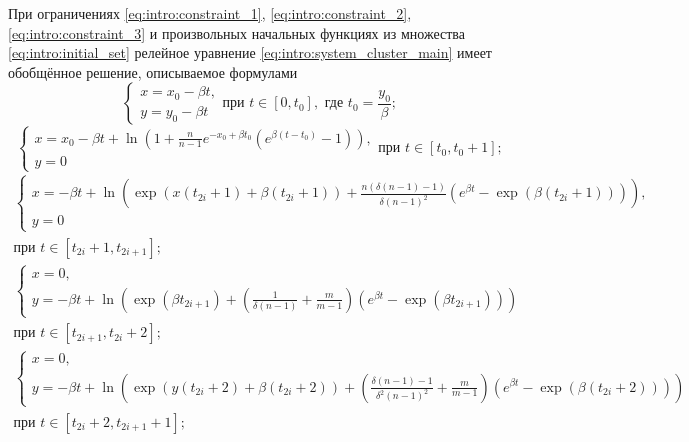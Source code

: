 	При ограничениях \eqref{eq:intro:constraint_1}, \eqref{eq:intro:constraint_2}, \eqref{eq:intro:constraint_3}  и произвольных начальных функциях из множества \eqref{eq:intro:initial_set} релейное уравнение \eqref{eq:intro:system_cluster_main} имеет обобщённое решение, описываемое формулами
	\small
	\begin{equation}
		\label{eq:intro:step1_solution}
		\begin{cases}
			x = x_0 - \beta t,\\
			y = y_0 - \beta t
		\end{cases}
		\text{при } t \in [0, t_0], \text{ где } t_0 = \dfrac{y_0}{\beta};
	\end{equation}
	\begin{equation}
		\label{eq:intro:step2_solution}
		\begin{cases}
			x = x_0 - \beta t + \ln\left(1 + \frac{n}{n - 1} e^{-x_0 + \beta t_0}  (e^{\beta  (t - t_0)} - 1)\right),\\
			y = 0
		\end{cases}
		\text{при } t \in [t_0, t_0 + 1];
	\end{equation}
	\begin{multline}
		\label{eq:intro:step3_solution}
		\begin{cases}
			x = -\beta t + \ln\left(\exp(x(t_{2i} + 1) + \beta (t_{2i} + 1)) + \frac{n (\delta(n - 1) - 1)}{\delta (n - 1)^2} (e^{\beta t} - \exp(\beta (t_{2i} + 1)))\right)
			,\\
			y = 0
		\end{cases}\\
		\text{при } t \in [t_{2i} + 1, t_{2i + 1}];
	\end{multline}
	\begin{multline}
		\label{eq:intro:step4_solution}
		\begin{cases}
			x = 0,\\
			y = -\beta t + \ln\left(\exp(\beta t_{2i + 1}) + \left(\frac{1}{\delta(n - 1)} + \frac{m}{m - 1}\right) (e^{\beta t} - \exp(\beta t_{2i + 1}))\right)
		\end{cases}\\
		\text{при } t \in [t_{2i + 1}, t_{2i} + 2];
	\end{multline}
	\begin{multline}
		\label{eq:intro:step5_solution}
		\begin{cases}
			x = 0,\\
			y = -\beta t + \ln\left(\exp(y(t_{2i} + 2) + \beta (t_{2i} + 2)) + \left(\frac{\delta(n - 1) - 1}{\delta^2 (n - 1)^2} + \frac{m}{m - 1}\right) (e^{\beta t} - \exp(\beta (t_{2i} + 2)))\right)
		\end{cases}\\
		\text{при } t \in [t_{2i} + 2, t_{2i + 1} + 1];
	\end{multline}
